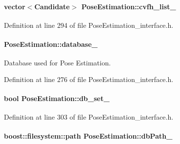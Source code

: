 \hypertarget{classPoseEstimation_a173da6a606273315659157e43fe4c3ef}{
\paragraph[{cvfh\-\_\-list\-\_\-}]{\setlength{\rightskip}{0pt plus 5cm}vector$<${\bf Candidate}$>$ Pose\-Estimation\-::cvfh\-\_\-list\-\_\-\hspace{0.3cm}{\ttfamily [private]}}}\label{classPoseEstimation_a173da6a606273315659157e43fe4c3ef}


Definition at line 294 of file Pose\-Estimation\-\_\-interface.\-h.

\hypertarget{classPoseEstimation_a4c10437a72b2b8ac97cf92a55ee12236}{
\paragraph[{database\-\_\-}]{ Pose\-Estimation\-::database\-\_\-\hspace{0.3cm}{\ttfamily [private]}}}\label{classPoseEstimation_a4c10437a72b2b8ac97cf92a55ee12236}


Database used for Pose Estimation. 



Definition at line 276 of file Pose\-Estimation\-\_\-interface.\-h.

\hypertarget{classPoseEstimation_a86f675bcf1d652f32c3241f593a981ac}{
\paragraph[{db\-\_\-set\-\_\-}]{\setlength{\rightskip}{0pt plus 5cm}bool Pose\-Estimation\-::db\-\_\-set\-\_\-\hspace{0.3cm}{\ttfamily [private]}}}\label{classPoseEstimation_a86f675bcf1d652f32c3241f593a981ac}


Definition at line 303 of file Pose\-Estimation\-\_\-interface.\-h.

\hypertarget{classPoseEstimation_acac4c572e8500c78522eb1a741c908cb}{
\paragraph[{db\-Path\-\_\-}]{\setlength{\rightskip}{0pt plus 5cm}boost\-::filesystem\-::path Pose\-Estimation\-::db\-Path\-\_\-\hspace{0.3cm}{\ttfamily [private]}}}\label{classPoseEstimation_acac4c572e8500c78522eb1a741c908cb}


